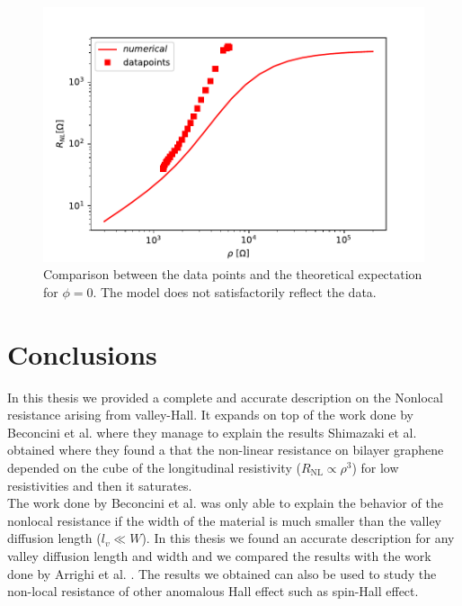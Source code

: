 \begin{figure}[h!]
    \centering
    \includegraphics[width=\linewidth]{Immagini/rnl/rebecca_2.pdf}
    \caption{Comparison between the data points and the theoretical expectation for $\phi=0$. The model does not satisfactorily reflect the data.}
    \label{fig:rebecca 0}
\end{figure}

\section{Conclusions}
In this thesis we provided a complete and accurate description on the Nonlocal resistance arising from valley-Hall. It expands on top of the work done by Beconcini et al. \cite{Beconcini_2016} where they manage to explain the results Shimazaki et al. obtained  \cite{shimazaki2015generation} where they found a that the non-linear resistance on bilayer graphene depended on the cube of the longitudinal resistivity ($R_\textrm{NL}\propto \rho^3$) for low resistivities and then it saturates.\\ 
The work done by Beconcini et al. was only able to explain the behavior of the nonlocal resistance if the width of the material is much smaller than the valley diffusion length ($l_v\ll W$). In this thesis we found an accurate description for any valley diffusion length and width and we compared the results with the work done by Arrighi et al. \cite{rebecca2022moirè}.
The results we obtained can also be used to study the non-local resistance of other anomalous Hall effect such as spin-Hall effect.